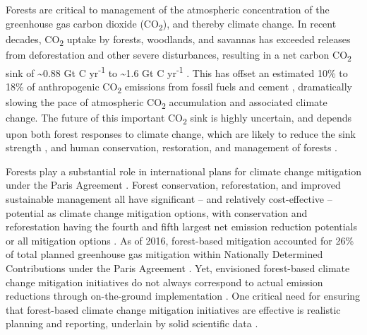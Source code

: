 \documentclass[, manuscript]{copernicus}
\begin{document}
Forests are critical to management of the atmospheric concentration of
the greenhouse gas carbon dioxide (CO\textsubscript{2}), and thereby
climate change. In recent decades, CO\textsubscript{2} uptake by
forests, woodlands, and savannas has exceeded releases from
deforestation and other severe disturbances, resulting in a net carbon
CO\textsubscript{2} sink of \textasciitilde0.88 Gt C
yr\textsuperscript{-1} \citep[all biomes with trees,][]{xu_changes_2021}
to \textasciitilde1.6 Gt C yr\textsuperscript{-1} \citep[forests
only,][]{harris_global_2021}. This has offset an estimated 10\% to 18\%
of anthropogenic CO\textsubscript{2} emissions from fossil fuels and
cement \citep{xu_changes_2021, harris_global_2021}, dramatically slowing
the pace of atmospheric CO\textsubscript{2} accumulation and associated
climate change. The future of this important CO\textsubscript{2} sink is
highly uncertain, and depends upon both forest responses to climate
change, which are likely to reduce the sink strength
\citep{mcdowell_pervasive_2020, hammond_global_2022}, and human
conservation, restoration, and management of forests
\citep{ipcc_climate_2019, ipcc_climate_2022}.

Forests play a substantial role in international plans for climate
change mitigation under the Paris Agreement
\citep{unfccc_adoption_2015}. Forest conservation, reforestation, and
improved sustainable management all have significant -- and relatively
cost-effective -- potential as climate change mitigation options, with
conservation and reforestation having the fourth and fifth largest net
emission reduction potentials or all mitigation options
\citep{ipcc_summary_2022}. As of 2016, forest-based mitigation accounted
for 26\% of total planned greenhouse gas mitigation within Nationally
Determined Contributions under the Paris Agreement
\citep{grassi_key_2017}. Yet, envisioned forest-based climate change
mitigation initiatives do not always correspond to actual emission
reductions through on-the-ground implementation
\citep[e.g.,][]{badgley_systematic_2022}. One critical need for ensuring
that forest-based climate change mitigation initiatives are effective is
realistic planning and reporting, underlain by solid scientific data
\citep{anderson-teixeira_effective_2022, deng_comparing_2021}.
\end{document}
